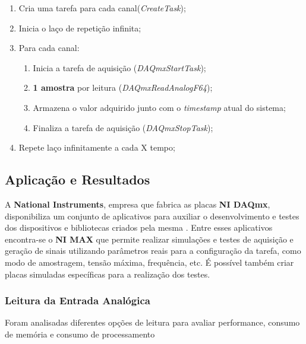 \documentclass{ufscThesis}
\begin{document}
\begin{enumerate}
  \item Cria uma tarefa para cada canal(\textit{CreateTask});
  \item Inicia o laço de repetição infinita;
  \item Para cada canal:
    \begin{enumerate}
      \item Inicia a tarefa de aquisição (\textit{DAQmxStartTask});
      \item \textbf{1 amostra} por leitura (\textit{DAQmxReadAnalogF64});
      \item Armazena o valor adquirido junto com o \textit{timestamp} atual do sistema;
      \item Finaliza a tarefa de aquisição (\textit{DAQmxStopTask});
    \end{enumerate}
  \item Repete laço infinitamente a cada X tempo;
\end{enumerate}

\subsection{Aplicação e Resultados}\label{aplicacao-resultado}
A \textbf{National Instruments}, empresa que fabrica as placas \textbf{NI DAQmx}, disponibiliza um conjunto de aplicativos para auxiliar o desenvolvimento e testes dos dispositivos e bibliotecas criados pela mesma \cite{nidaqmx-cd-9.8}. Entre esses aplicativos encontra-se o \textbf{NI MAX} que permite realizar simulações e testes de aquisição e geração de sinais utilizando parâmetros reais para a configuração da tarefa, como modo de amostragem, tensão máxima, frequência, etc. É possível também criar placas simuladas específicas para a realização dos testes.

\subsubsection{Leitura da Entrada Analógica}
Foram analisadas diferentes opções de leitura para avaliar performance, consumo de memória e consumo de processamento
\end{document}
